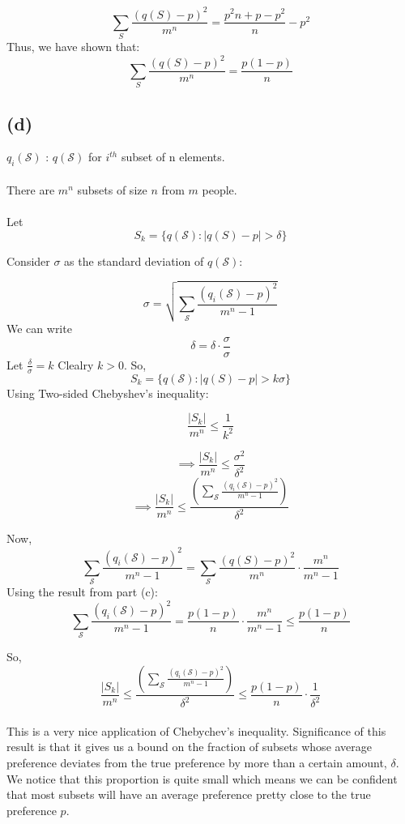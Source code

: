 \documentclass{report}
\begin{document}
\[\sum_{S} \frac{\left(q(S) - p\right)^{2}}{m^{n}} = \frac{p^2n + p -p^2}{n} - p^2\]
Thus, we have shown that:
\[\sum_{S} \frac{\left(q(S) - p\right)^{2}}{m^{n}} = \frac{p(1-p)}{n}\]

\subsection*{(d)}
\(q_i(\mathcal{S})\) : \(q(\mathcal{S})\) for \(i^{th}\) subset of n elements.
\\\\
There are \(m^n\) subsets of size \(n\) from \(m\) people.
\\\\
Let 
\[S_k = \{q(\mathcal{S})  : |q(S)-p| > \delta \}\]

Consider $\sigma$ as the standard deviation of \(q(\mathcal{S})\):

\[\sigma = \sqrt{\sum_{\mathcal{S}} \frac{(q_i(\mathcal{S}) - p)^{2}}{m^{n}-1}}\]
We can write 
\[\delta = \delta \cdot \frac{\sigma}{\sigma}\]
Let \(\frac{\delta}{\sigma} = k\) Clealry \( k >  0\). So,
\[S_k = \{q(\mathcal{S})  : |q(S)-p| > k\sigma \}\]
Using Two-sided Chebyshev's inequality:

\[\frac{|S_k|}{m^n}  \leq  \frac{1}{k^2}\]

\[\implies \frac{|S_k|}{m^n}  \leq  \frac{\sigma ^ 2}{\delta^2}\]
\[\implies \frac{|S_k|}{m^n}  \leq  \frac{({\sum_{\mathcal{S}} \frac{(q_i(\mathcal{S}) - p)^{2}}{m^{n}-1}}) }{\delta^2}\]

Now,
\[\sum_{\mathcal{S}} \frac{(q_i(\mathcal{S}) - p)^{2}}{m^{n}-1} = \sum_{\mathcal{S}} \frac{\left(q(S) - p\right)^{2}}{m^{n}} \cdot {\frac{m^n}{m^n -1}}\]
Using the result from part (c):
\[\sum_{\mathcal{S}} \frac{(q_i(\mathcal{S}) - p)^{2}}{m^{n}-1} =\frac{p(1-p)}{n} \cdot {\frac{m^n}{m^n -1}} \leq {\frac{p(1-p)}{n}}\]

So,
\[\frac{|S_k|}{m^n}  \leq  \frac{({\sum_{\mathcal{S}} \frac{(q_i(\mathcal{S}) - p)^{2}}{m^{n}-1}}) }{\delta^2}\leq {\frac{p(1-p)}{n}} \cdot \frac{1}{\delta^2}\]\\

This is a very nice application of Chebychev's inequality.
Significance of this result is that it gives us a bound on the fraction of subsets whose average preference deviates from the true preference by more than a certain amount, \(\delta\).
We notice that this proportion is quite small which means we can be confident that most subsets will have an average preference pretty close to the true preference \(p\).
\end{document}
